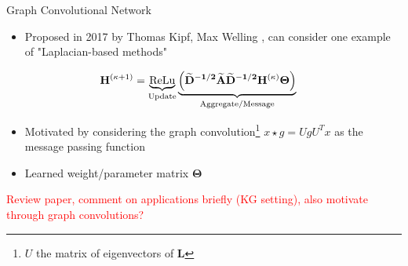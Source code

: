 \documentclass{beamer}
\newcommand{\node}{v}
\newcommand{\nrepresent}{h}
\newcommand{\NodeRepMat}{\mathbf{H}}
\newcommand{\edge}{e}
\newcommand{\DegMat}{\mathbf{D}}
\newcommand{\iter}{\kappa}
\newcommand{\AdjMat}{\mathbf{A}}
\newcommand{\LapMat}{\mathbf{L}}
\newcommand{\ReLu}{\text{ReLu}}
\begin{document}
\begin{frame}{Graph Convolutional Network}
    \begin{itemize}
    \item Proposed in 2017 by Thomas Kipf, Max Welling \cite{kipf_semi-supervised_2017}, can consider one example of "Laplacian-based methods" \cite{gilmer_neural_2017} 
    \end{itemize}
    
    \begin{align*}
        \iffalse
            \mathbf{\nrepresent}_\node^{(\iter+1)} 
            &=
            \text{Update}
            \left( 
            x_\node^{(\iter)}
            ,   
            \text{Aggregate}
            (
                \nrepresent_\node^{(\iter)}, x_u^{(\iter)}, \edge_{u,\node}^{(\iter)}
            )
            \right)
        \\
        \fi 
            \NodeRepMat^{(\iter+1)} 
            &=
            \underbrace{\ReLu}_{\text{Update}}
            \underbrace{
            \left( 
                \mathbf{
                \widetilde{\DegMat}^{-1/2}
                \widetilde{\AdjMat}
                \widetilde{\DegMat}^{-1/2}  
                \NodeRepMat^{(\iter)}
                \Theta 
                }            
            \right)
            }_{\text{Aggregate/Message}}
    \end{align*}
    
    \begin{itemize}
        \item Motivated by considering the graph convolution\footnote{$U$ the matrix of eigenvectors of $\LapMat$} $x \star g = UgU^Tx$ as the message passing function 
        \item Learned weight/parameter matrix $\boldsymbol\Theta$
    \end{itemize}
    \textcolor{red}{Review paper, comment on applications briefly (KG setting), also motivate through graph convolutions?}
    \end{frame}
\end{document}
